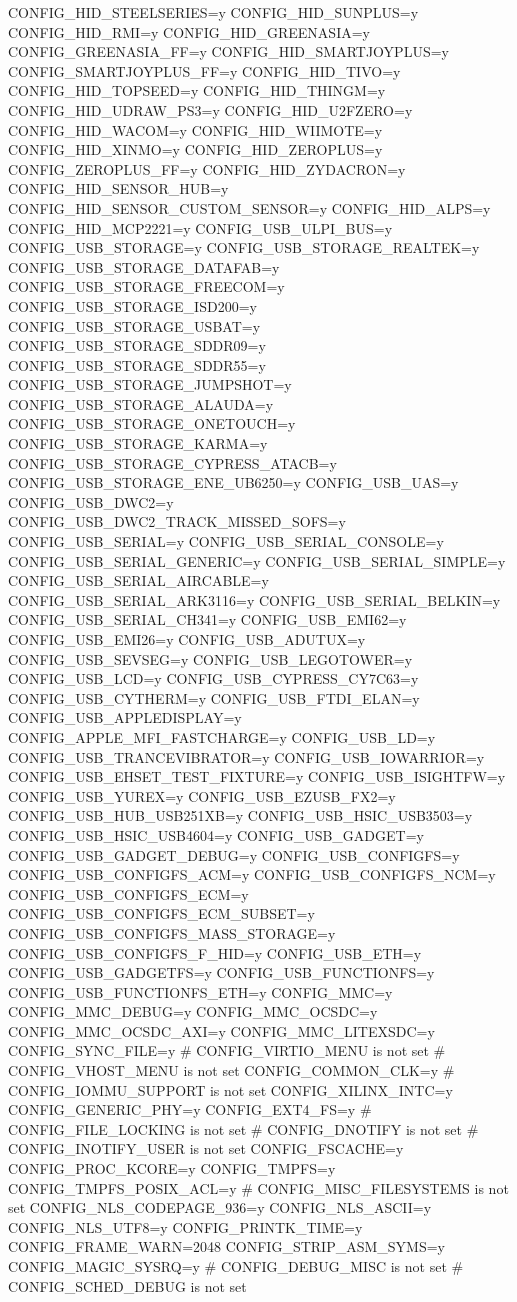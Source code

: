 \begin{CodeBlock}[language=BookConfig]
CONFIG_HID_STEELSERIES=y
CONFIG_HID_SUNPLUS=y
CONFIG_HID_RMI=y
CONFIG_HID_GREENASIA=y
CONFIG_GREENASIA_FF=y
CONFIG_HID_SMARTJOYPLUS=y
CONFIG_SMARTJOYPLUS_FF=y
CONFIG_HID_TIVO=y
CONFIG_HID_TOPSEED=y
CONFIG_HID_THINGM=y
CONFIG_HID_UDRAW_PS3=y
CONFIG_HID_U2FZERO=y
CONFIG_HID_WACOM=y
CONFIG_HID_WIIMOTE=y
CONFIG_HID_XINMO=y
CONFIG_HID_ZEROPLUS=y
CONFIG_ZEROPLUS_FF=y
CONFIG_HID_ZYDACRON=y
CONFIG_HID_SENSOR_HUB=y
CONFIG_HID_SENSOR_CUSTOM_SENSOR=y
CONFIG_HID_ALPS=y
CONFIG_HID_MCP2221=y
CONFIG_USB_ULPI_BUS=y
CONFIG_USB_STORAGE=y
CONFIG_USB_STORAGE_REALTEK=y
CONFIG_USB_STORAGE_DATAFAB=y
CONFIG_USB_STORAGE_FREECOM=y
CONFIG_USB_STORAGE_ISD200=y
CONFIG_USB_STORAGE_USBAT=y
CONFIG_USB_STORAGE_SDDR09=y
CONFIG_USB_STORAGE_SDDR55=y
CONFIG_USB_STORAGE_JUMPSHOT=y
CONFIG_USB_STORAGE_ALAUDA=y
CONFIG_USB_STORAGE_ONETOUCH=y
CONFIG_USB_STORAGE_KARMA=y
CONFIG_USB_STORAGE_CYPRESS_ATACB=y
CONFIG_USB_STORAGE_ENE_UB6250=y
CONFIG_USB_UAS=y
CONFIG_USB_DWC2=y
CONFIG_USB_DWC2_TRACK_MISSED_SOFS=y
CONFIG_USB_SERIAL=y
CONFIG_USB_SERIAL_CONSOLE=y
CONFIG_USB_SERIAL_GENERIC=y
CONFIG_USB_SERIAL_SIMPLE=y
CONFIG_USB_SERIAL_AIRCABLE=y
CONFIG_USB_SERIAL_ARK3116=y
CONFIG_USB_SERIAL_BELKIN=y
CONFIG_USB_SERIAL_CH341=y
CONFIG_USB_EMI62=y
CONFIG_USB_EMI26=y
CONFIG_USB_ADUTUX=y
CONFIG_USB_SEVSEG=y
CONFIG_USB_LEGOTOWER=y
CONFIG_USB_LCD=y
CONFIG_USB_CYPRESS_CY7C63=y
CONFIG_USB_CYTHERM=y
CONFIG_USB_FTDI_ELAN=y
CONFIG_USB_APPLEDISPLAY=y
CONFIG_APPLE_MFI_FASTCHARGE=y
CONFIG_USB_LD=y
CONFIG_USB_TRANCEVIBRATOR=y
CONFIG_USB_IOWARRIOR=y
CONFIG_USB_EHSET_TEST_FIXTURE=y
CONFIG_USB_ISIGHTFW=y
CONFIG_USB_YUREX=y
CONFIG_USB_EZUSB_FX2=y
CONFIG_USB_HUB_USB251XB=y
CONFIG_USB_HSIC_USB3503=y
CONFIG_USB_HSIC_USB4604=y
CONFIG_USB_GADGET=y
CONFIG_USB_GADGET_DEBUG=y
CONFIG_USB_CONFIGFS=y
CONFIG_USB_CONFIGFS_ACM=y
CONFIG_USB_CONFIGFS_NCM=y
CONFIG_USB_CONFIGFS_ECM=y
CONFIG_USB_CONFIGFS_ECM_SUBSET=y
CONFIG_USB_CONFIGFS_MASS_STORAGE=y
CONFIG_USB_CONFIGFS_F_HID=y
CONFIG_USB_ETH=y
CONFIG_USB_GADGETFS=y
CONFIG_USB_FUNCTIONFS=y
CONFIG_USB_FUNCTIONFS_ETH=y
CONFIG_MMC=y
CONFIG_MMC_DEBUG=y
CONFIG_MMC_OCSDC=y
CONFIG_MMC_OCSDC_AXI=y
CONFIG_MMC_LITEXSDC=y
CONFIG_SYNC_FILE=y
# CONFIG_VIRTIO_MENU is not set
# CONFIG_VHOST_MENU is not set
CONFIG_COMMON_CLK=y
# CONFIG_IOMMU_SUPPORT is not set
CONFIG_XILINX_INTC=y
CONFIG_GENERIC_PHY=y
CONFIG_EXT4_FS=y
# CONFIG_FILE_LOCKING is not set
# CONFIG_DNOTIFY is not set
# CONFIG_INOTIFY_USER is not set
CONFIG_FSCACHE=y
CONFIG_PROC_KCORE=y
CONFIG_TMPFS=y
CONFIG_TMPFS_POSIX_ACL=y
# CONFIG_MISC_FILESYSTEMS is not set
CONFIG_NLS_CODEPAGE_936=y
CONFIG_NLS_ASCII=y
CONFIG_NLS_UTF8=y
CONFIG_PRINTK_TIME=y
CONFIG_FRAME_WARN=2048
CONFIG_STRIP_ASM_SYMS=y
CONFIG_MAGIC_SYSRQ=y
# CONFIG_DEBUG_MISC is not set
# CONFIG_SCHED_DEBUG is not set
\end{CodeBlock}

